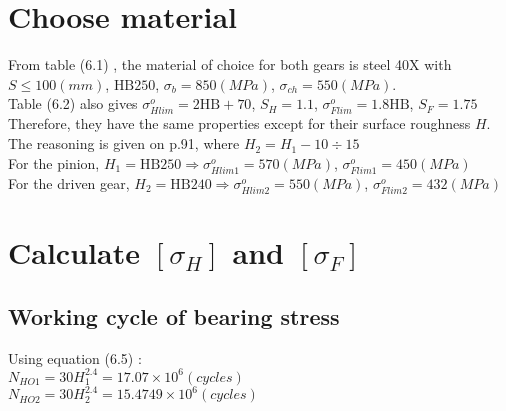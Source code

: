 \section{Choose material}
From table (6.1) , the material of choice for both gears is steel 40X with $ S\leq100\unit{(mm)} $, $ \text{HB} 250 $, $ \sigma_b = 850\unit{(MPa)} $, $ \sigma_{ch} = 550 \unit{(MPa)}$.\\
Table (6.2)  also gives $ \sigma_{Hlim}^o = 2\text{HB} + 70$, $ S_H = 1.1 $, $ \sigma_{Flim}^o = 1.8\text{HB} $, $ S_F = 1.75 $\\
Therefore, they have the same properties except for their surface roughness $ H $. The reasoning is given on p.91, where $ H_2 = H_1 - 10 \div 15$ \\
For the pinion, $ H_1=\text{HB}250 \Rightarrow \sigma_{Hlim1}^o = 570\unit{(MPa)}$, $ \sigma_{Flim1}^o = 450\unit{(MPa)}$\\
For the driven gear, $ H_2=\text{HB}240 \Rightarrow \sigma_{Hlim2}^o = 550\unit{(MPa)}$, $ \sigma_{Flim2}^o = 432\unit{(MPa)}$

\section{Calculate $ [\sigma_H] $ and $ [\sigma_F] $}

\subsection{Working cycle of bearing stress}
Using equation (6.5) :\\
$ N_{HO1} = 30H_1^{2.4} = 17.07\times10^6\unit{(cycles)}$\\
$ N_{HO2} = 30H_2^{2.4} = 15.4749\times10^6\unit{(cycles)}$

